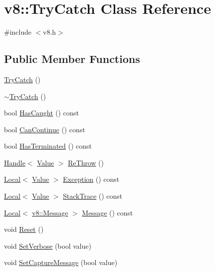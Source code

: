 \hypertarget{classv8_1_1TryCatch}{\section{v8\-:\-:Try\-Catch Class Reference}
\label{classv8_1_1TryCatch}
}


{\ttfamily \#include $<$v8.\-h$>$}

\subsection*{Public Member Functions}
\begin{DoxyCompactItemize}
\item 
\hyperlink{classv8_1_1TryCatch_adc9b1b11e73b0325df727914c348053d}{Try\-Catch} ()
\item 
\hyperlink{classv8_1_1TryCatch_a2c9ad4b40d17dd31c6dd020736b30679}{$\sim$\-Try\-Catch} ()
\item 
bool \hyperlink{classv8_1_1TryCatch_a48f704fbf2b82564b5d2a4ff596e4137}{Has\-Caught} () const 
\item 
bool \hyperlink{classv8_1_1TryCatch_a2ec467d4653d26c064d749cab98791cb}{Can\-Continue} () const 
\item 
bool \hyperlink{classv8_1_1TryCatch_a7e012477ac47db9480f85d55427987c7}{Has\-Terminated} () const 
\item 
\hyperlink{classv8_1_1Handle}{Handle}$<$ \hyperlink{classv8_1_1Value}{Value} $>$ \hyperlink{classv8_1_1TryCatch_a4a7506617800bbc49c3c08bbfefb9c2d}{Re\-Throw} ()
\item 
\hyperlink{classv8_1_1Local}{Local}$<$ \hyperlink{classv8_1_1Value}{Value} $>$ \hyperlink{classv8_1_1TryCatch_a99c425f29b3355b4294cbe762377f99b}{Exception} () const 
\item 
\hyperlink{classv8_1_1Local}{Local}$<$ \hyperlink{classv8_1_1Value}{Value} $>$ \hyperlink{classv8_1_1TryCatch_a1ee3e6ee74a4fc50185443ccdc4d3ae7}{Stack\-Trace} () const 
\item 
\hyperlink{classv8_1_1Local}{Local}$<$ \hyperlink{classv8_1_1Message}{v8\-::\-Message} $>$ \hyperlink{classv8_1_1TryCatch_a2811e500fbb906ee505895a3d94fc66f}{Message} () const 
\item 
void \hyperlink{classv8_1_1TryCatch_a3aae8acab4c99b374b7d782763d4c8e1}{Reset} ()
\item 
void \hyperlink{classv8_1_1TryCatch_a032cd889d76bd596e2616df11ced8682}{Set\-Verbose} (bool value)
\item 
void \hyperlink{classv8_1_1TryCatch_a541b8fa6951bd5a439692c22d5c7b73c}{Set\-Capture\-Message} (bool value)
\end{DoxyCompactItemize}
